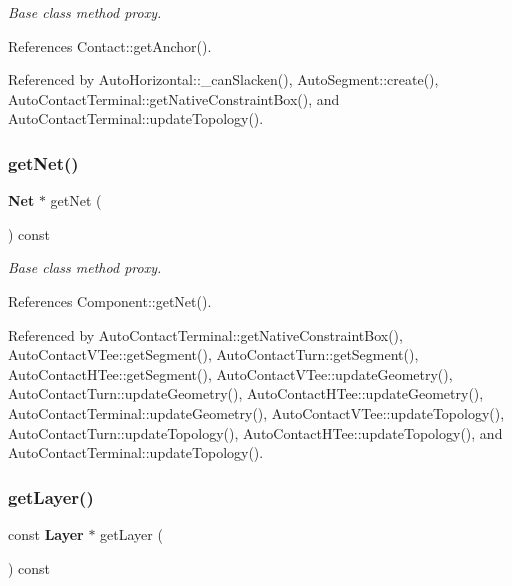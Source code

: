 {\itshape Base class method proxy.} 

References Contact\+::get\+Anchor().



Referenced by Auto\+Horizontal\+::\+\_\+can\+Slacken(), Auto\+Segment\+::create(), Auto\+Contact\+Terminal\+::get\+Native\+Constraint\+Box(), and Auto\+Contact\+Terminal\+::update\+Topology().

\mbox{\label{classKatabatic_1_1AutoContact_a692492374623a5c6096b2c4a51190359}} 
\subsubsection{\texorpdfstring{get\+Net()}{getNet()}}
{\footnotesize\ttfamily \textbf{ Net} $\ast$ get\+Net (\begin{DoxyParamCaption}{ }\end{DoxyParamCaption}) const\hspace{0.3cm}{\ttfamily [inline]}}

{\itshape Base class method proxy.} 

References Component\+::get\+Net().



Referenced by Auto\+Contact\+Terminal\+::get\+Native\+Constraint\+Box(), Auto\+Contact\+V\+Tee\+::get\+Segment(), Auto\+Contact\+Turn\+::get\+Segment(), Auto\+Contact\+H\+Tee\+::get\+Segment(), Auto\+Contact\+V\+Tee\+::update\+Geometry(), Auto\+Contact\+Turn\+::update\+Geometry(), Auto\+Contact\+H\+Tee\+::update\+Geometry(), Auto\+Contact\+Terminal\+::update\+Geometry(), Auto\+Contact\+V\+Tee\+::update\+Topology(), Auto\+Contact\+Turn\+::update\+Topology(), Auto\+Contact\+H\+Tee\+::update\+Topology(), and Auto\+Contact\+Terminal\+::update\+Topology().

\mbox{\label{classKatabatic_1_1AutoContact_ab045567c4f529dca7790d66c17c3084f}} 
\subsubsection{\texorpdfstring{get\+Layer()}{getLayer()}}
{\footnotesize\ttfamily const \textbf{ Layer} $\ast$ get\+Layer (\begin{DoxyParamCaption}{ }\end{DoxyParamCaption}) const\hspace{0.3cm}{\ttfamily [inline]}}

